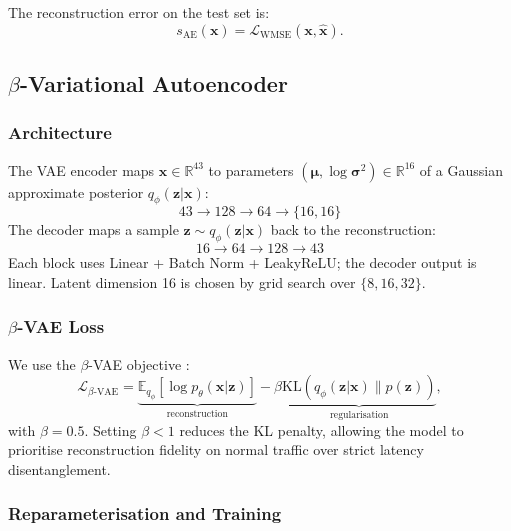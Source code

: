 \documentclass[conference]{IEEEtran}
\begin{document}
The reconstruction error on the test set is:
\begin{equation}
  s_\text{AE}(\mathbf{x}) = \mathcal{L}_\text{WMSE}(\mathbf{x}, \hat{\mathbf{x}}).
\end{equation}

\subsection{$\beta$-Variational Autoencoder}

\subsubsection{Architecture}

The VAE encoder maps $\mathbf{x}\in\mathbb{R}^{43}$ to parameters
$(\boldsymbol{\mu},\log\boldsymbol{\sigma}^2)\in\mathbb{R}^{16}$ of a Gaussian
approximate posterior $q_\phi(\mathbf{z}|\mathbf{x})$:
\begin{equation}
  43 \to 128 \to 64 \to \{16,16\}
\end{equation}
The decoder maps a sample $\mathbf{z}\sim q_\phi(\mathbf{z}|\mathbf{x})$ back
to the reconstruction:
\begin{equation}
  16 \to 64 \to 128 \to 43
\end{equation}
Each block uses Linear + Batch Norm + LeakyReLU; the decoder output is linear.
Latent dimension 16 is chosen by grid search over $\{8,16,32\}$.

\subsubsection{$\beta$-VAE Loss}

We use the $\beta$-VAE objective \cite{higgins2017beta}:
\begin{equation}
  \mathcal{L}_{\beta\text{-VAE}} =
    \underbrace{\mathbb{E}_{q_\phi}[\log p_\theta(\mathbf{x}|\mathbf{z})]}_{\text{reconstruction}}
    - \beta\underbrace{\mathrm{KL}(q_\phi(\mathbf{z}|\mathbf{x})\|p(\mathbf{z}))}_{\text{regularisation}},
\end{equation}
with $\beta=0.5$. Setting $\beta<1$ reduces the KL penalty, allowing the
model to prioritise reconstruction fidelity on normal traffic over strict
latency disentanglement.

\subsubsection{Reparameterisation and Training}
\end{document}

